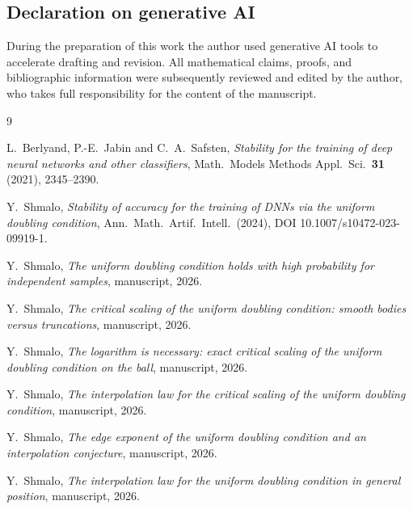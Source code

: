\documentclass[11pt]{article}
\begin{document}
\subsection*{Declaration on generative AI}
During the preparation of this work the author used generative AI tools to
accelerate drafting and revision.  All mathematical claims, proofs, and
bibliographic information were subsequently reviewed and edited by the author,
who takes full responsibility for the content of the manuscript.

\begin{thebibliography}{9}

L.~Berlyand, P.-E.~Jabin and C.~A.~Safsten,
\emph{Stability for the training of deep neural networks and other classifiers},
Math.\ Models Methods Appl.\ Sci.\ \textbf{31} (2021), 2345--2390.

Y.~Shmalo,
\emph{Stability of accuracy for the training of DNNs via the uniform doubling
condition}, Ann.\ Math.\ Artif.\ Intell.\ (2024),
DOI 10.1007/s10472-023-09919-1.

Y.~Shmalo, \emph{The uniform doubling condition holds with high probability for
independent samples}, manuscript, 2026.

Y.~Shmalo, \emph{The critical scaling of the uniform doubling condition: smooth
bodies versus truncations}, manuscript, 2026.

Y.~Shmalo, \emph{The logarithm is necessary: exact critical scaling of the
uniform doubling condition on the ball}, manuscript, 2026.

Y.~Shmalo, \emph{The interpolation law for the critical scaling of the uniform
doubling condition}, manuscript, 2026.

Y.~Shmalo, \emph{The edge exponent of the uniform doubling condition and an
interpolation conjecture}, manuscript, 2026.

Y.~Shmalo, \emph{The interpolation law for the uniform doubling condition in
general position}, manuscript, 2026.

\end{thebibliography}
\end{document}
